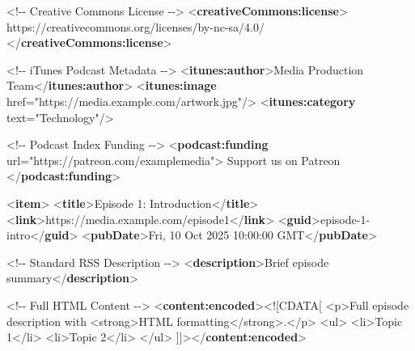\documentclass[
  letterpaper,
  DIV=11,
  numbers=noendperiod]{scrartcl}
\newenvironment{Shaded}{\begin{snugshade}}{\end{snugshade}}
\newcommand{\BaseNTok}[1]{\textcolor[rgb]{0.68,0.00,0.00}{#1}}
\newcommand{\CommentTok}[1]{\textcolor[rgb]{0.37,0.37,0.37}{#1}}
\newcommand{\KeywordTok}[1]{\textcolor[rgb]{0.00,0.23,0.31}{\textbf{#1}}}
\newcommand{\NormalTok}[1]{\textcolor[rgb]{0.00,0.23,0.31}{#1}}
\newcommand{\OtherTok}[1]{\textcolor[rgb]{0.00,0.23,0.31}{#1}}
\newcommand{\StringTok}[1]{\textcolor[rgb]{0.13,0.47,0.30}{#1}}
\begin{document}
\begin{Shaded}
\begin{Highlighting}[]
    \CommentTok{\textless{}!{-}{-} Creative Commons License {-}{-}\textgreater{}}
\NormalTok{    \textless{}}\KeywordTok{creativeCommons:license}\NormalTok{\textgreater{}}
\NormalTok{      https://creativecommons.org/licenses/by{-}nc{-}sa/4.0/}
\NormalTok{    \textless{}/}\KeywordTok{creativeCommons:license}\NormalTok{\textgreater{}}
    
    \CommentTok{\textless{}!{-}{-} iTunes Podcast Metadata {-}{-}\textgreater{}}
\NormalTok{    \textless{}}\KeywordTok{itunes:author}\NormalTok{\textgreater{}Media Production Team\textless{}/}\KeywordTok{itunes:author}\NormalTok{\textgreater{}}
\NormalTok{    \textless{}}\KeywordTok{itunes:image}\OtherTok{ href=}\StringTok{"https://media.example.com/artwork.jpg"}\NormalTok{/\textgreater{}}
\NormalTok{    \textless{}}\KeywordTok{itunes:category}\OtherTok{ text=}\StringTok{"Technology"}\NormalTok{/\textgreater{}}
    
    \CommentTok{\textless{}!{-}{-} Podcast Index Funding {-}{-}\textgreater{}}
\NormalTok{    \textless{}}\KeywordTok{podcast:funding}\OtherTok{ url=}\StringTok{"https://patreon.com/examplemedia"}\NormalTok{\textgreater{}}
\NormalTok{    Support us on Patreon}
\NormalTok{    \textless{}/}\KeywordTok{podcast:funding}\NormalTok{\textgreater{}}
    
\NormalTok{    \textless{}}\KeywordTok{item}\NormalTok{\textgreater{}}
\NormalTok{   \textless{}}\KeywordTok{title}\NormalTok{\textgreater{}Episode 1: Introduction\textless{}/}\KeywordTok{title}\NormalTok{\textgreater{}}
\NormalTok{    \textless{}}\KeywordTok{link}\NormalTok{\textgreater{}https://media.example.com/episode1\textless{}/}\KeywordTok{link}\NormalTok{\textgreater{}}
\NormalTok{      \textless{}}\KeywordTok{guid}\NormalTok{\textgreater{}episode{-}1{-}intro\textless{}/}\KeywordTok{guid}\NormalTok{\textgreater{}}
\NormalTok{      \textless{}}\KeywordTok{pubDate}\NormalTok{\textgreater{}Fri, 10 Oct 2025 10:00:00 GMT\textless{}/}\KeywordTok{pubDate}\NormalTok{\textgreater{}}
      
      \CommentTok{\textless{}!{-}{-} Standard RSS Description {-}{-}\textgreater{}}
\NormalTok{      \textless{}}\KeywordTok{description}\NormalTok{\textgreater{}Brief episode summary\textless{}/}\KeywordTok{description}\NormalTok{\textgreater{}}
      
      \CommentTok{\textless{}!{-}{-} Full HTML Content {-}{-}\textgreater{}}
\NormalTok{ \textless{}}\KeywordTok{content:encoded}\NormalTok{\textgreater{}}\BaseNTok{\textless{}![CDATA[}
\NormalTok{        \textless{}p\textgreater{}Full episode description with \textless{}strong\textgreater{}HTML formatting\textless{}/strong\textgreater{}.\textless{}/p\textgreater{}}
\NormalTok{        \textless{}ul\textgreater{}}
\NormalTok{ \textless{}li\textgreater{}Topic 1\textless{}/li\textgreater{}}
\NormalTok{          \textless{}li\textgreater{}Topic 2\textless{}/li\textgreater{}}
\NormalTok{  \textless{}/ul\textgreater{}}
      \BaseNTok{]]\textgreater{}}\NormalTok{\textless{}/}\KeywordTok{content:encoded}\NormalTok{\textgreater{}}
      

\end{Highlighting}
\end{Shaded}
\end{document}
